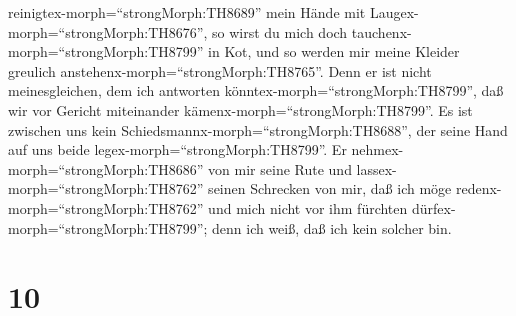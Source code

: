 reinigtex-morph=``strongMorph:TH8689'' mein Hände mit
Laugex-morph=``strongMorph:TH8676'',  so wirst du mich doch
tauchenx-morph=``strongMorph:TH8799'' in Kot, und so werden mir meine
Kleider greulich anstehenx-morph=``strongMorph:TH8765''. 
Denn er ist nicht meinesgleichen, dem ich antworten
könntex-morph=``strongMorph:TH8799'', daß wir vor Gericht miteinander
kämenx-morph=``strongMorph:TH8799''.  Es ist zwischen uns
kein Schiedsmannx-morph=``strongMorph:TH8688'', der seine Hand auf uns
beide legex-morph=``strongMorph:TH8799''.  Er
nehmex-morph=``strongMorph:TH8686'' von mir seine Rute und
lassex-morph=``strongMorph:TH8762'' seinen Schrecken von mir,
 daß ich möge redenx-morph=``strongMorph:TH8762'' und mich
nicht vor ihm fürchten dürfex-morph=``strongMorph:TH8799''; denn ich
weiß, daß ich kein solcher bin.

\hypertarget{section-9}{%
\section{10}\label{section-9}}

